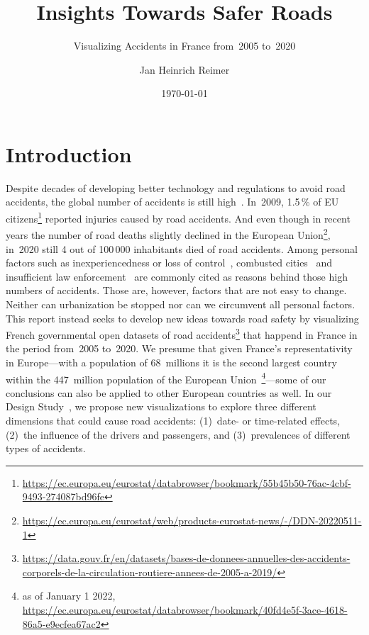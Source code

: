 \documentclass[usegeometry=true]{scrartcl}
\newcommand{\Ni}{(1)~}
\newcommand{\Nii}{(2)~}
\newcommand{\Niii}{(3)~}
\begin{document}
\subject{Project Report for the Module \\  \\ in Summer Semester~2022}
\title{Insights Towards Safer Roads}
\subtitle{Visualizing Accidents in France from~2005 to~2020}
\author{Jan Heinrich Reimer}
\date{\today}
\maketitle


\section{Introduction}
Despite decades of developing better technology and regulations to avoid road accidents, the global number of accidents is still high~\cite{Who2015}. In~2009, 1.5\,\% of EU citizens\footnote{\url{https://ec.europa.eu/eurostat/databrowser/bookmark/55b45b50-76ac-4cbf-9493-274087bd96fe}} reported injuries caused by road accidents. And even though in recent years the number of road deaths slightly declined in the European Union\footnote{\url{https://ec.europa.eu/eurostat/web/products-eurostat-news/-/DDN-20220511-1}}, in~2020 still 4 out of 100\,000 inhabitants died of road accidents. Among personal factors such as inexperiencedness or loss of control~\cite{RolisonRMF2018}, combusted cities~\cite{AlbalateF2021} and insufficient law enforcement~\cite{Who2015} are commonly cited as reasons behind those high numbers of accidents. Those are, however, factors that are not easy to change. Neither can urbanization be stopped nor can we circumvent all personal factors. This report instead seeks to develop new ideas towards road safety by visualizing French governmental open datasets of road accidents\footnote{\url{https://data.gouv.fr/en/datasets/bases-de-donnees-annuelles-des-accidents-corporels-de-la-circulation-routiere-annees-de-2005-a-2019/}} that happend in France in the period from~2005 to~2020. We presume that given France's representativity in Europe---with a population of 68~millions it is the second largest country within the 447~million population of the European Union~\footnote{as of January 1 2022, \url{https://ec.europa.eu/eurostat/databrowser/bookmark/40fd4e5f-3ace-4618-86a5-e9ecfea67ac2}}---some of our conclusions can also be applied to other European countries as well. In our Design Study~\cite{Munzner2008}, we propose new visualizations to explore three different dimensions that could cause road accidents: \Ni date- or time-related effects, \Nii the influence of the drivers and passengers, and \Niii prevalences of different types of accidents.
\end{document}
